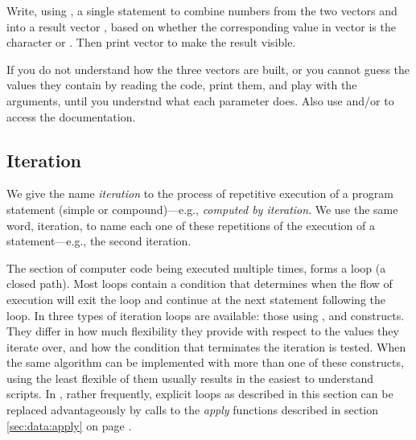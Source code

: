 \documentclass[krantz2]{krantz}\usepackage{knitr}
\begin{document}
\begin{playground}
Write, using , a single statement to combine numbers from the two vectors  and  into a result vector , based on whether the corresponding value in vector  is the character  or . Then print vector  to make the result visible.

\begin{knitrout}\footnotesize
{}\color{fgcolor}\begin{kframe}
\begin{alltt}
 \hlkwb{<-} \hlopt{-}\hlopt{:-}
 \hlkwb{<-} \hlopt{+}\hlopt{:}
 \hlkwb{<-} \hlstd{(}\hlstd{(}\hlstd{,} \hlstd{),} \hlstd{(}\hlstd{,} \hlstd{))}
\end{alltt}
\end{kframe}
\end{knitrout}

If you do not understand how the three vectors are built, or you cannot guess the values they contain by reading the code, print them, and play with the arguments, until you understnd what each parameter does. Also use  and/or  to access the documentation.
\end{playground}

\subsection{Iteration}
We give the name \emph{iteration} to the process of repetitive execution of a program statement (simple or compound)---e.g., \emph{computed by iteration}. We use the same word, iteration, to name each one of these repetitions of the execution of a statement---e.g.,  the second iteration.

The section of computer code being executed multiple times, forms a loop (a closed path). Most loops contain a condition that determines when the flow of execution will exit the loop and continue at the next statement following the loop. In \Rlang three types of iteration loops are available: those using ,  and  constructs. They differ in how much flexibility they provide with respect to the values they iterate over, and how the condition that terminates the iteration is tested. When the same algorithm can be implemented with more than one of these constructs, using the least flexible of them usually results in the easiest to understand \Rlang scripts. In \Rlang, rather frequently, explicit loops as described in this section can be replaced advantageously by calls to the \emph{apply} functions described in section \ref{sec:data:apply} on page \pageref{sec:data:apply}.
\end{document}
